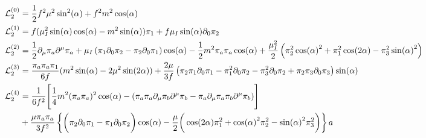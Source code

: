 \documentclass{article}
\begin{document}
\begin{align*}
\mathcal{L}^{(0)}_2 
&  =
    \frac{1}{2} f^2 \mu ^2 \sin ^2(\alpha )
    + f^2 m^2 \cos (\alpha ) 
\\
\mathcal{L}^{(1)}_2    
& =
    f 
    (
        \mu_I^2 \sin (\alpha) \cos (\alpha)
        - m^2\sin (\alpha)
    )\pi_1 
    + f \mu_I \sin(\alpha) \partial_0\pi _2
\\
\mathcal{L}^{(2)}_2 
& =
    \frac{1}{2} \partial_\mu\pi_a\partial^\mu\pi_a
    + \mu_I  \left( \pi_1 \partial_0\pi_2 - \pi_2\partial_0\pi_1 \right) \cos(\alpha)
    - \frac{1}{2} m^2 \pi_a\pi_a \cos (\alpha )
    + \frac{\mu_I ^2 }{2}
    \left(
          \pi_2^2 \cos(\alpha)^2
        + \pi_1^2 \cos (2 \alpha )
        - \pi_3^2 \sin(\alpha)^2
    \right) 
\\
\mathcal{L}^{(3)}_2 
& =
    \frac{\pi_a\pi_a \pi_1}{6f}
    (m^2 \sin (\alpha )-2\mu ^2 \sin (2\alpha ))
    + 
    \frac{2 \mu}{3 f}
    \left(
        \pi_2 \pi_1\partial_0\pi_1
        - \pi_1^2 \partial_0\pi_2
        - \pi_3^2\partial_0\pi_2
        + \pi_2 \pi_3 \partial_0\pi _3
    \right)\sin (\alpha )
\\
\mathcal{L}^{(4)}_2 
& =
\frac{1}{6f^2}
\Bigg[
    \frac{1}{4} m^2 (\pi_a\pi_a)^2 \cos(\alpha)
    -
    (
        \pi_a \pi_a \partial_\mu \pi_b \partial^\mu \pi_b 
        - \pi_a \partial_\mu \pi_a \pi_b \partial^\mu \pi_b 
    )
\Bigg]
\\
&
+ \frac{\mu \pi_a\pi_a}{3f^2}
\left\{     
    \bigg(\pi_2\partial_0 \pi_1 - \pi_1 \partial_0 \pi_2\bigg) 
    \cos(\alpha)
    - \frac{\mu}{2}
    \bigg(
        \cos(2\alpha) \pi_1^2
        + \cos(\alpha)^2 \pi_2^2
        - \sin(\alpha)^2 \pi_3^2
    \bigg)
 \right\}a
\end{align*}
\end{document}
